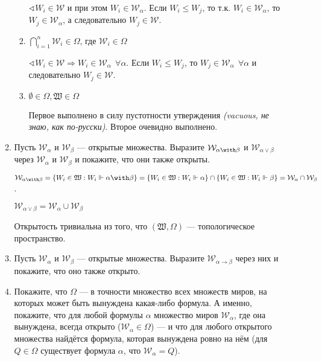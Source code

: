 \begin{enumerate}[wide, labelwidth=!, labelindent=0pt]
\begin{enumerate}
\begin{enumerate}
                              \(\sphericalangle W_i \in \mathcal{W}\) и при этом \(W_i\in \mathcal{W}_\alpha\). Если \(W_i \leq W_j\), то т.к. \(W_i \in \mathcal{W}_\alpha\), то \(W_j \in \mathcal{W}_\alpha\), а следовательно \(W_j \in \mathcal{W}\).

                        \item \(\bigcap_{i = 1}^{n} \mathcal{W}_i \in \Omega\), где \(\mathcal{W}_i \in\Omega\)

                              \(\sphericalangle W_i \in \mathcal{W} \Rightarrow W_i \in \mathcal{W}_\alpha \ \ \forall \alpha\). Если \(W_i \leq W_j\), то \(W_j \in \mathcal{W}_\alpha \ \ \forall \alpha\) и следовательно \(W_j \in \mathcal{W}\).

                        \item \(\emptyset\in\Omega, \mathfrak{W}\in \Omega\)

                              Первое выполнено в силу пустотности утверждения \textit{(vacuous, не знаю, как по-русски)}. Второе очевидно выполнено.
                    \end{enumerate}

              \item Пусть $\mathcal{W}_\alpha$ и $\mathcal{W}_\beta$ --- открытые множества. Выразите $\mathcal{W}_{\alpha\with\beta}$ и $\mathcal{W}_{\alpha\vee\beta}$
                    через $\mathcal{W}_\alpha$ и $\mathcal{W}_\beta$ и покажите, что они также открыты.

                    \(\mathcal{W}_{\alpha \with \beta} = \{W_i \in \mathfrak{W} : W_i \Vdash \alpha \with \beta\} = \{W_i \in \mathfrak{W} : W_i \Vdash \alpha\} \cap \{W_i \in \mathfrak{W} : W_i \Vdash \beta\} = \mathcal{W}_\alpha \cap \mathcal{W}_\beta\).

                    \(\mathcal{W}_{\alpha \lor \beta} = \mathcal{W}_\alpha \cup \mathcal{W}_\beta\)

                    Открытость тривиальна из того, что \((\mathfrak{W}, \Omega)\) --- топологическое пространство.

              \item Пусть $\mathcal{W}_\alpha$ и $\mathcal{W}_\beta$ --- открытые множества. Выразите $\mathcal{W}_{\alpha\rightarrow\beta}$ через
                    них и покажите, что оно также открыто.

              \item Покажите, что $\Omega$ --- в точности множество всех множеств миров, на которых может быть вынуждена какая-либо формула.
                    А именно, покажите, что для любой формулы $\alpha$ множество миров $\mathcal{W}_\alpha$, где она вынуждена, всегда открыто
                    ($\mathcal{W}_\alpha \in \Omega$) --- и что для любого открытого множества найдётся формула, которая вынуждена ровно на нём
                    (для $Q \in \Omega$ существует формула $\alpha$, что $\mathcal{W}_\alpha = Q$).
          \end{enumerate}


\end{enumerate}

